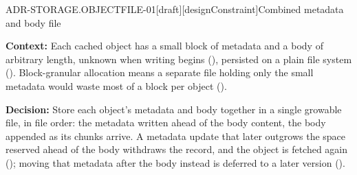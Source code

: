 \begin{requirement}{ADR-STORAGE.OBJECTFILE-01}[draft][designConstraint]{Combined metadata and body file}


  \textbf{Context:} Each cached object has a small block of metadata and a body
  of arbitrary length, unknown when writing begins
  (), persisted on a plain file system
  (). Block-granular allocation means a
  separate file holding only the small metadata would waste most of a block
  per object ().

  \textbf{Decision:} Store each object's metadata and body together in a
  single growable file, in file order: the metadata written ahead of the
  body content, the body appended as its chunks arrive. A metadata update
  that later outgrows the space reserved ahead of the body withdraws the
  record, and the object is fetched again
  (); moving that metadata after the body
  instead is deferred to a later version ().


\end{requirement}
